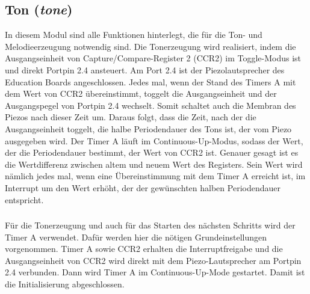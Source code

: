 \subsection{Ton (\emph{tone})} %
\label{sub:ton}
In diesem Modul sind alle Funktionen hinterlegt, die für die Ton- und Melodieerzeugung notwendig sind.
Die Tonerzeugung wird realisiert, indem die Ausgangseinheit von Capture/Compare-Register 2 (CCR2) im Toggle-Modus ist und direkt Portpin 2.4 ansteuert. Am Port 2.4 ist der Piezolautsprecher des Education Boards angeschlossen. Jedes mal, wenn der Stand des Timers A mit dem Wert von CCR2 übereinstimmt, toggelt die Ausgangseinheit und der Ausgangspegel von Portpin 2.4 wechselt. Somit schaltet auch die Membran des Piezos nach dieser Zeit um. Daraus folgt, dass die Zeit, nach der die Ausgangseinheit toggelt, die halbe Periodendauer des Tons ist, der vom Piezo ausgegeben wird. Der Timer A läuft im Continuous-Up-Modus, sodass der Wert, der die Periodendauer bestimmt, der Wert von CCR2 ist. Genauer gesagt ist es die Wertdifferenz zwischen altem und neuem Wert des Registers. Sein Wert wird nämlich jedes mal, wenn eine Übereinstimmung mit dem Timer A erreicht ist, im Interrupt um den Wert erhöht, der der gewünschten halben Periodendauer entspricht.

\subsubsection{} %
\label{ssub:void_ton_init}
Für die Tonerzeugung und auch für das Starten des nächsten Schritts wird der Timer A verwendet. Dafür werden hier die nötigen Grundeinstellungen vorgenommen. Timer A sowie CCR2 erhalten die Interruptfreigabe und die Ausgangseinheit von CCR2 wird direkt mit dem Piezo-Lautsprecher am Portpin 2.4 verbunden. Dann wird Timer A im Continuous-Up-Mode gestartet. Damit ist die Initialisierung abgeschlossen.

